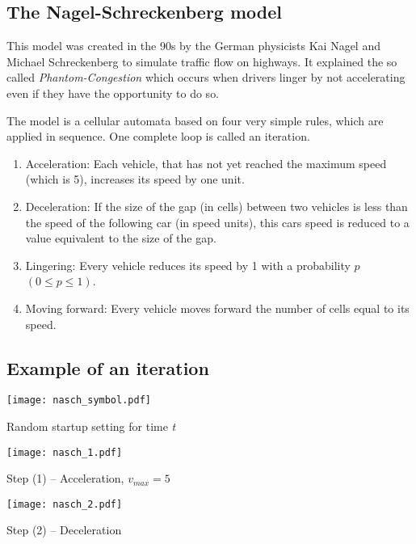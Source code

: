 \subsection{The Nagel-Schreckenberg model}
This model was created in the 90s by the German physicists Kai Nagel and Michael Schreckenberg to simulate 
traffic flow on highways. It explained the so called \textit{Phantom-Congestion} which occurs when drivers 
linger by not accelerating even if they have the opportunity to do so.

The model is a cellular automata based on four very simple rules, which are applied in sequence. One complete loop is called an iteration.

\begin{enumerate}
\item Acceleration: Each vehicle, that has not yet reached the maximum speed (which is 5), increases its speed by one unit.
\item Deceleration: If the size of the gap (in cells) between two vehicles is less than the speed of the following car (in speed units), this cars speed is reduced to a value equivalent to the size of the gap.
\item Lingering: Every vehicle reduces its speed by 1 with a probability $p$ $(0 \leq p \leq 1)$.
\item Moving forward: Every vehicle moves forward the number of cells equal to its speed.
\end{enumerate}

\subsection{Example of an iteration}
\texttt{[image: nasch\_symbol.pdf]} \vspace*{1cm}

Random startup setting for time \textit{t}\\ \vspace{-.2cm}

\texttt{[image: nasch\_1.pdf]}\vspace*{1cm}

Step (1) -- Acceleration, $v_{max} = 5$\\ \vspace{-.2cm}

\texttt{[image: nasch\_2.pdf]}\vspace*{1cm}

Step (2) -- Deceleration\\ \vspace{-.2cm}


